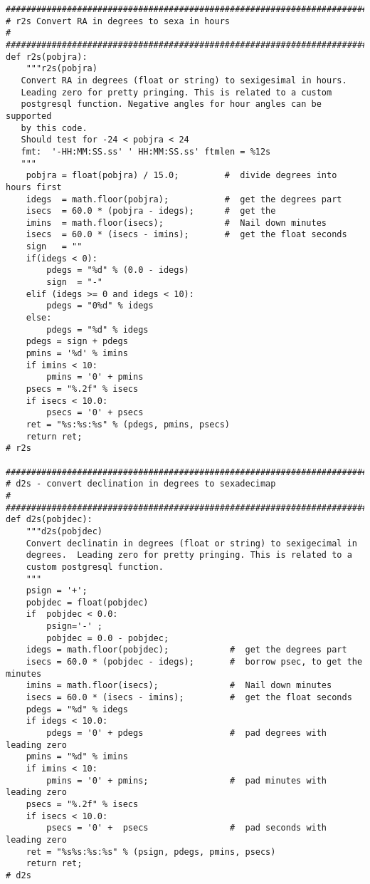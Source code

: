 {\begin{verbatim}
##############################################################################
# r2s Convert RA in degrees to sexa in hours
#
##############################################################################
def r2s(pobjra):
    """r2s(pobjra)
   Convert RA in degrees (float or string) to sexigesimal in hours.
   Leading zero for pretty pringing. This is related to a custom
   postgresql function. Negative angles for hour angles can be supported
   by this code.
   Should test for -24 < pobjra < 24
   fmt:  '-HH:MM:SS.ss' ' HH:MM:SS.ss' ftmlen = %12s
   """
    pobjra = float(pobjra) / 15.0;         #  divide degrees into hours first
    idegs  = math.floor(pobjra);           #  get the degrees part
    isecs  = 60.0 * (pobjra - idegs);      #  get the
    imins  = math.floor(isecs);            #  Nail down minutes
    isecs  = 60.0 * (isecs - imins);       #  get the float seconds
    sign   = ""
    if(idegs < 0):
        pdegs = "%d" % (0.0 - idegs)
        sign  = "-"
    elif (idegs >= 0 and idegs < 10):
        pdegs = "0%d" % idegs
    else:
        pdegs = "%d" % idegs
    pdegs = sign + pdegs
    pmins = '%d' % imins
    if imins < 10:
        pmins = '0' + pmins
    psecs = "%.2f" % isecs
    if isecs < 10.0:
        psecs = '0' + psecs
    ret = "%s:%s:%s" % (pdegs, pmins, psecs)
    return ret;
# r2s

##############################################################################
# d2s - convert declination in degrees to sexadecimap
#
##############################################################################
def d2s(pobjdec):
    """d2s(pobjdec)
    Convert declinatin in degrees (float or string) to sexigecimal in
    degrees.  Leading zero for pretty pringing. This is related to a
    custom postgresql function.
    """
    psign = '+';
    pobjdec = float(pobjdec)
    if  pobjdec < 0.0:
        psign='-' ;
        pobjdec = 0.0 - pobjdec;
    idegs = math.floor(pobjdec);            #  get the degrees part
    isecs = 60.0 * (pobjdec - idegs);       #  borrow psec, to get the minutes
    imins = math.floor(isecs);              #  Nail down minutes
    isecs = 60.0 * (isecs - imins);         #  get the float seconds
    pdegs = "%d" % idegs
    if idegs < 10.0:
        pdegs = '0' + pdegs                 #  pad degrees with leading zero
    pmins = "%d" % imins
    if imins < 10:
        pmins = '0' + pmins;                #  pad minutes with leading zero
    psecs = "%.2f" % isecs
    if isecs < 10.0:
        psecs = '0' +  psecs                #  pad seconds with leading zero
    ret = "%s%s:%s:%s" % (psign, pdegs, pmins, psecs)
    return ret;
# d2s


\end{verbatim}}
